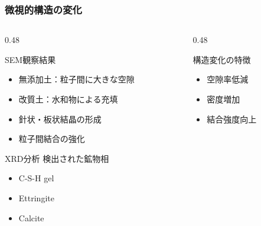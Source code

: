 \documentclass[unicode, 9pt, aspectratio=43]{beamer}
\begin{document}
\begin{refsection}
  \begin{frame}
    \frametitle{微視的構造の変化}
    \begin{columns}
      \begin{column}{0.48\linewidth}
        \begin{alertblock}{SEM観察結果}
          \begin{itemize}
            \item 無添加土：粒子間に大きな空隙
            \item 改質土：水和物による充填
            \item 針状・板状結晶の形成
            \item 粒子間結合の強化
          \end{itemize}
        \end{alertblock}

        \vspace{1em}

        \begin{block}{XRD分析}
          検出された鉱物相
          \begin{itemize}
            \item C-S-H gel
            \item Ettringite
            \item Calcite
          \end{itemize}
        \end{block}
      \end{column}

      \begin{column}{0.48\linewidth}
        \begin{exampleblock}{構造変化の特徴}
          \centering
          \vspace{0.5em}
          \vspace{0.5em}

          \begin{itemize}
            \item 空隙率低減
            \item 密度増加
            \item 結合強度向上
          \end{itemize}
        \end{exampleblock}
      \end{column}
    \end{columns}


\end{frame}
\end{refsection}
\end{document}
